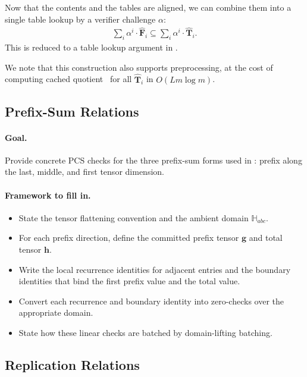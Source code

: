 Now that the contents and the tables are aligned,
  we can combine them into a single table lookup by a verifier challenge $\alpha$:
  \begin{align}
    \sum_i \alpha^i\cdot \widehat{\mathbf{F}}_i \subseteq \sum_i \alpha^i\cdot \widehat{\mathbf{T}}_i.
  \end{align}
  This is reduced to a table lookup argument in \cite{cq++24}.

We note that this construction also supports preprocessing,
  at the cost of computing cached quotient~\cite{cq22}
  for all $\widehat{\mathbf{T}}_i$ in $O(Lm\log m)$.

\subsection{Prefix-Sum Relations}\label{app:prefix-sum}

\paragraph{Goal.}
Provide concrete PCS checks for the three prefix-sum forms used in
: prefix along the last, middle, and first tensor
dimension.

\paragraph{Framework to fill in.}
\begin{itemize}
    \item State the tensor flattening convention and the ambient domain
    $\mathbb{H}_{abc}$.
    \item For each prefix direction, define the committed prefix tensor
    $\mathbf{g}$ and total tensor $\mathbf{h}$.
    \item Write the local recurrence identities for adjacent entries and the
    boundary identities that bind the first prefix value and the total value.
    \item Convert each recurrence and boundary identity into zero-checks over
    the appropriate domain.
    \item State how these linear checks are batched by domain-lifting batching.
\end{itemize}

\subsection{Replication Relations}\label{app:replication}

